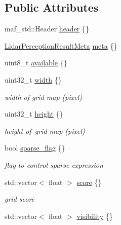 \subsection*{Public Attributes}
\begin{DoxyCompactItemize}
\item 
maf\+\_\+std\+::\+Header \hyperlink{structmaf__perception__interface_1_1LidarBEVGridMapResult_a91a2468b8888e598ff5c87e91a869355}{header} \{\}
\item 
\hyperlink{structmaf__perception__interface_1_1LidarPerceptionResultMeta}{Lidar\+Perception\+Result\+Meta} \hyperlink{structmaf__perception__interface_1_1LidarBEVGridMapResult_a31299f47d5944abde543ec5907e40063}{meta} \{\}
\item 
uint8\+\_\+t \hyperlink{structmaf__perception__interface_1_1LidarBEVGridMapResult_a655870c3e8b23b9134ee5138327adc5b}{available} \{\}
\item 
uint32\+\_\+t \hyperlink{structmaf__perception__interface_1_1LidarBEVGridMapResult_a3b8e4f459d30418443e278d59561b37e}{width} \{\}
\begin{DoxyCompactList}\small\item\em width of grid map (pixel) \end{DoxyCompactList}\item 
uint32\+\_\+t \hyperlink{structmaf__perception__interface_1_1LidarBEVGridMapResult_aeb5585a7cc2839e5f905143780e77f0b}{height} \{\}
\begin{DoxyCompactList}\small\item\em height of grid map (pixel) \end{DoxyCompactList}\item 
bool \hyperlink{structmaf__perception__interface_1_1LidarBEVGridMapResult_a8d899df66d38d9985e77211d53fcbf7c}{sparse\+\_\+flag} \{\}
\begin{DoxyCompactList}\small\item\em flag to control sparse expression \end{DoxyCompactList}\item 
std\+::vector$<$ float $>$ \hyperlink{structmaf__perception__interface_1_1LidarBEVGridMapResult_a12d15d22f9daea6c3b74a7b5b4d999ff}{score} \{\}
\begin{DoxyCompactList}\small\item\em grid score \end{DoxyCompactList}\item 
std\+::vector$<$ float $>$ \hyperlink{structmaf__perception__interface_1_1LidarBEVGridMapResult_a8a5cb4ae0efeca22fe19a6f1f19e0f49}{visibility} \{\}

\end{DoxyCompactItemize}
